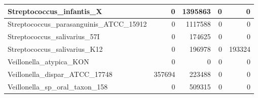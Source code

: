\documentclass[12pt,a4paper]{article}
\begin{document}
\begin{table}[ht]
\begin{center}
\begin{tabular}{|l*{4}{|r}|}
Streptococcus\_infantis\_X & 0 & 1395863 & 0 & 0 \\ \hline
Streptococcus\_parasanguinis\_ATCC\_15912 & 0 & 1117588 & 0 & 0 \\ \hline
Streptococcus\_salivarius\_57I & 0 & 174625 & 0 & 0 \\ \hline
Streptococcus\_salivarius\_K12 & 0 & 196978 & 0 & 193324 \\ \hline
Veillonella\_atypica\_KON & 0 & 0 & 0 & 0 \\ \hline
Veillonella\_dispar\_ATCC\_17748 & 357694 & 223488 & 0 & 0 \\ \hline
Veillonella\_sp\_oral\_taxon\_158 & 0 & 509315 & 0 & 0 \\ \hline
\end{tabular}
\end{center}
\end{table}
\end{document}
